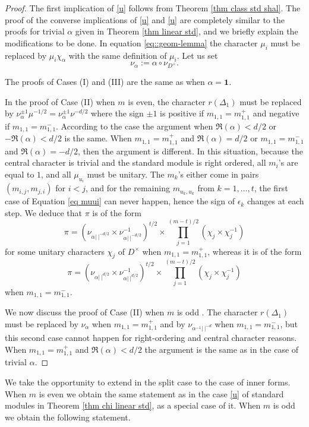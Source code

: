 \documentclass[11pt,letterpaper]{amsart}
\newcommand{\re}{\mathfrak{R}}
\newcommand{\triv}{{\mathbf{1}}}
\def\D{\Delta}
\def\e{\epsilon}
\theoremstyle{plain}
\numberwithin{equation}{section}
\begin{document}
\begin{proof}
The first implication of \eqref{u} follows from Theorem \ref{thm class std shal}. The proof of the converse implications of \eqref{u} and \eqref{u} are completely similar to the proofs for trivial $\alpha$ given in Theorem \ref{thm linear std}, and we briefly explain the modifications to be done. 
In equation \eqref{eq::geom-lemma} the character $\mu_i$ must be replaced by $\mu_i\chi_{\alpha}$ with the same definition of $\mu_i$. 
Let us set \[\nu_{\alpha}:=\alpha\circ \nu_{D^\times}.\] 

The proofs of Cases (I) and (III) are the same as when $\alpha=\triv$.

In the proof of Case (II) when $m$ is even, the character $r(\D_1)$ must be replaced by $\nu_{\alpha}^{\pm 1} \mu^{-1/2}=\nu_{\alpha}^{\pm 1}\nu^{-d/2}$ where the sign $\pm 1$ is positive if $m_{1,1}=m_{1,1}^+$ and negative if $m_{1,1}=m_{1,1}^-$. According to the case the argument when 
$\re(\alpha)<d/2$ or $-\re(\alpha)<d/2$ is the same. When $m_{1,1}=m_{1,1}^+$ and $\re(\alpha)=d/2$ or $m_{1,1}=m_{1,1}^-$ and $\re(\alpha)=-d/2$, then the argument is different. In this situation, because the central character is trivial and the standard module is right ordered, all $m_i$'s are equal to $1$, and all $\mu_{u_i}$ must be unitary. The $m_k$'s either come in pairs  $(m_{i,j},m_{j,i})$ for $i<j$, and for the remaining $m_{u_k,u_k}$ from $k=1,\dots,t$, the first case of Equation \eqref{eq muui} can never happen, hence the sign of $\e_k$ changes at each step. We deduce that $\pi$ is of the form 
\[\pi=(\nu_{\alpha|\ |^{-d/2}}\times \nu_{\alpha|\ |^{-d/2}}^{-1})^{t/2}\times \prod_{j=1}^{(m-t)/2}(\chi_j\times \chi_j^{-1})\] for some unitary characters $\chi_j$ of $D^\times$ when $m_{1,1}=m_{1,1}^+$, whereas it is of the form \[\pi=(\nu_{\alpha|\ |^{d/2}}\times \nu_{\alpha|\ |^{d/2}}^{-1})^{t/2}\times \prod_{j=1}^{(m-t)/2}(\chi_j\times \chi_j^{-1})\] when $m_{1,1}=m_{1,1}^-$. 

We now discuss the  proof of Case (II) when $m$ is odd . The character $r(\D_1)$ must be replaced by $\nu_{\alpha}$ when $m_{1,1}=m_{1,1}^+$ and by $\nu_{\alpha^{-1}|\ |^{-d}}$ when $m_{1,1}=m_{1,1}^-$, but this second case cannot happen for right-ordering and central character reasons. When $m_{1,1}=m_{1,1}^+$ and $\re(\alpha)<d/2$ the argument is the same as in the case of trivial $\alpha$. 

\end{proof}

We take the opportunity to extend \cite[Theorems 3.13]{MatCRELLE} in the split case to the case of inner forms. When $m$ is even we obtain the same statement as in the case \eqref{u} of standard modules in Theorem \ref{thm chi linear std}, as a special case of it. When $m$ is odd we obtain the following statement.
 
\end{document}
